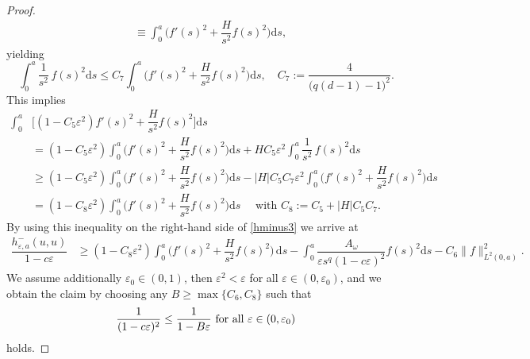 \documentclass[10pt,a4paper]{amsart}
\newcommand{\dd}{\mathrm{d}}
\newcommand{\eps}{\varepsilon}
\begin{document}
\begin{proof}
\begin{align*}
&\equiv \int_0^a \bigg(f'(s)^2+\dfrac{H}{s^2}f(s)^2\bigg)\dd s,
\end{align*}
yielding
\[
\int_0^a \dfrac{1}{s^2}\, f(s)^2\dd s\le C_7 \int_0^a \bigg(f'(s)^2+\dfrac{H}{s^2}f(s)^2\bigg)\dd s,
\quad C_7:=\dfrac{4}{\big(q(d-1)-1\big)^2}.
\]
This implies
\begin{align*}
\int_0^a&\bigg[(1-C_5\eps^2)f'(s)^2 +\dfrac{H}{s^2} f(s)^2\bigg]\dd s\\
&=(1-C_5\eps^2)\int_0^a\bigg(f'(s)^2+\dfrac{H}{s^2}f(s)^2\bigg)\dd s +H C_5 \eps^2 \int_0^a \dfrac{1}{s^2}\, f(s)^2\dd s\\
&\ge (1-C_5\eps^2)\int_0^a\bigg(f'(s)^2+\dfrac{H}{s^2}f(s)^2\bigg)\dd s- |H|C_5C_7\eps^2 \int_0^a \bigg(f'(s)^2+\dfrac{H}{s^2}f(s)^2\bigg)\dd s\\
&= (1-C_8\eps^2)\int_0^a\bigg(f'(s)^2+\dfrac{H}{s^2}f(s)^2\bigg)\dd s\quad
\text{ with }C_8:=C_5+|H|C_5C_7.
\end{align*}
By using this inequality on the right-hand side of \eqref{hminus3} we arrive at
\begin{align*}
	\dfrac{h^-_{\eps,a}(u,u)}{1-c\eps}&\ge (1-C_8\eps^2)\int_0^a\bigg(f'(s)^2 +\dfrac{H}{s^2}f(s)^2\bigg)\,\dd s-\int_0^a\dfrac{A_\omega}{\eps s^q (1-c\eps)^2}	f(s)^2\dd s
-C_6\|f\|^2_{L^2(0,a)}.
\end{align*}
We assume additionally $\eps_0\in(0,1)$, then $\eps^2<\eps$ for all $\eps\in(0,\eps_0)$, and we obtain the claim by choosing any $B\ge \max\{C_6,C_8\}$ such that
\[
\dfrac{1}{(1-c\eps)^2}\le\dfrac{1}{1-B\eps} \text{ for all }\eps\in(0,\eps_0) \qedhere
\]
holds.
\end{proof}
\end{document}
